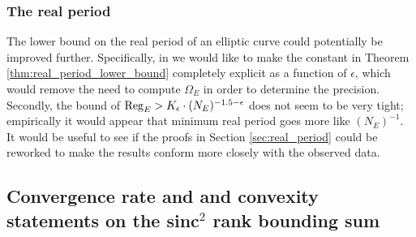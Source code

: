 \subsubsection{The real period}

The lower bound on the real period of an elliptic curve could potentially be improved further. Specifically, in  we would like to make the constant in Theorem \ref{thm:real_period_lower_bound} completely explicit as a function of $\epsilon$, which would remove the need to compute $\Omega_E$ in order to determine the precision. \\

Secondly, the bound of $\operatorname{Reg}_E > K_{\epsilon}\cdot (N_E)^{-1.5-\epsilon}$ does not seem to be very tight; empirically it would appear that minimum real period goes more like $(N_E)^{-1}$. It would be useful to see if the proofs in Section \ref{sec:real_period} could be reworked to make the results conform more closely with the observed data.


%

\subsection{Convergence rate and and convexity statements on the sinc$^2$ rank bounding sum}

